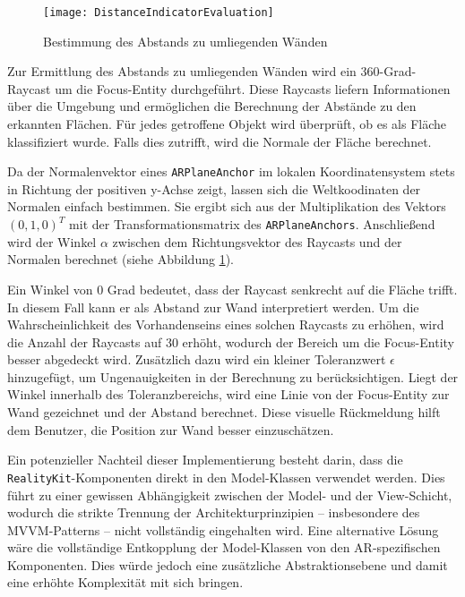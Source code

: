 \begin{figure}[ht]
    \centering
    \texttt{[image: DistanceIndicatorEvaluation]}
    \caption{Bestimmung des Abstands zu umliegenden Wänden}
    \label{fig:DistanceIndicatorEvaluation}
\end{figure}

Zur Ermittlung des Abstands zu umliegenden Wänden wird ein 360-Grad-Raycast um die Focus-Entity durchgeführt. Diese Raycasts liefern Informationen über die Umgebung und ermöglichen die Berechnung der Abstände zu den erkannten Flächen. Für jedes getroffene Objekt wird überprüft, ob es als Fläche klassifiziert wurde. Falls dies zutrifft, wird die Normale der Fläche berechnet.

Da der Normalenvektor eines \texttt{ARPlaneAnchor} im lokalen Koordinatensystem stets in Richtung der positiven y-Achse zeigt, lassen sich die Weltkoodinaten der Normalen einfach bestimmen. Sie ergibt sich aus der Multiplikation des Vektors \( (0,1,0)^T \) mit der Transformationsmatrix des \texttt{ARPlaneAnchors}. Anschließend wird der Winkel \( \alpha \) zwischen dem Richtungsvektor des Raycasts und der Normalen berechnet (siehe Abbildung \ref{fig:DistanceIndicatorEvaluation}). 

Ein Winkel von 0 Grad bedeutet, dass der Raycast senkrecht auf die Fläche trifft. In diesem Fall kann er als Abstand zur Wand interpretiert werden. Um die Wahrscheinlichkeit des Vorhandenseins eines solchen Raycasts zu erhöhen, wird die Anzahl der Raycasts auf 30 erhöht, wodurch der Bereich um die Focus-Entity besser abgedeckt wird. Zusätzlich dazu wird ein kleiner Toleranzwert \( \epsilon \) hinzugefügt, um Ungenauigkeiten in der Berechnung zu berücksichtigen. Liegt der Winkel innerhalb des Toleranzbereichs, wird eine Linie von der Focus-Entity zur Wand gezeichnet und der Abstand berechnet. Diese visuelle Rückmeldung hilft dem Benutzer, die Position zur Wand besser einzuschätzen.

Ein potenzieller Nachteil dieser Implementierung besteht darin, dass die \texttt{RealityKit}\linebreak-Komponenten direkt in den Model-Klassen verwendet werden. Dies führt zu einer gewissen Abhängigkeit zwischen der Model- und der View-Schicht, wodurch die strikte Trennung der Architekturprinzipien – insbesondere des MVVM-Patterns – nicht vollständig eingehalten wird. Eine alternative Lösung wäre die vollständige Entkopplung der Model-Klassen von den AR-spezifischen Komponenten. Dies würde jedoch eine zusätzliche Abstraktionsebene und damit eine erhöhte Komplexität mit sich bringen.

